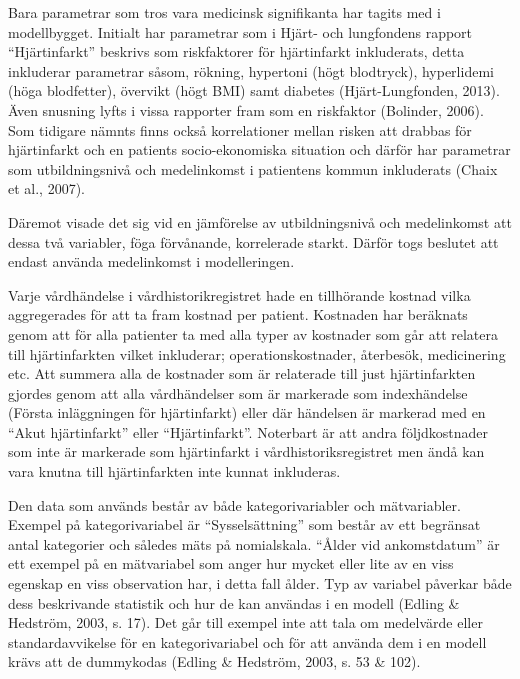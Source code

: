 Bara parametrar som tros vara medicinsk signifikanta har tagits med i modellbygget. Initialt har parametrar som i Hjärt- och lungfondens rapport “Hjärtinfarkt” beskrivs som riskfaktorer för hjärtinfarkt inkluderats, detta inkluderar parametrar såsom, rökning, hypertoni (högt blodtryck), hyperlidemi (höga blodfetter), övervikt (högt BMI) samt diabetes (Hjärt-Lungfonden, 2013). Även snusning lyfts i vissa rapporter fram som en riskfaktor (Bolinder, 2006). Som tidigare nämnts finns också korrelationer mellan risken att drabbas för hjärtinfarkt och en patients socio-ekonomiska situation och därför har parametrar som utbildningsnivå och medelinkomst i patientens kommun inkluderats (Chaix et al., 2007).

Däremot visade det sig vid en jämförelse av utbildningsnivå och medelinkomst att dessa två variabler, föga förvånande, korrelerade starkt. Därför togs beslutet att endast använda medelinkomst i modelleringen.

Varje vårdhändelse i vårdhistorikregistret hade en tillhörande kostnad vilka aggregerades för att ta fram kostnad per patient. Kostnaden har beräknats genom att för alla patienter ta med alla typer av kostnader som går att relatera till hjärtinfarkten vilket inkluderar; operationskostnader, återbesök, medicinering etc. Att summera alla de kostnader som är relaterade till just hjärtinfarkten gjordes genom att alla vårdhändelser som är markerade som indexhändelse (Första inläggningen för hjärtinfarkt) eller där händelsen är markerad med en “Akut hjärtinfarkt” eller “Hjärtinfarkt”. Noterbart är att andra följdkostnader som inte är markerade som hjärtinfarkt i vårdhistoriksregistret men ändå kan vara knutna till hjärtinfarkten inte kunnat inkluderas.


Den data som används består av både kategorivariabler och mätvariabler. Exempel på
kategorivariabel är “Sysselsättning” som består av ett begränsat antal
kategorier och således mäts på nomialskala. “Ålder vid ankomstdatum” är ett
exempel på en mätvariabel som anger hur mycket eller lite av en viss egenskap en
viss observation har, i detta fall ålder. Typ av variabel påverkar både dess
beskrivande statistik och hur de kan användas i en modell (Edling \& Hedström,
2003, s. 17). Det går till exempel inte att tala om medelvärde eller
standardavvikelse för en kategorivariabel och för att använda dem i en modell krävs att de dummykodas (Edling \& Hedström, 2003, s. 53 \& 102).

